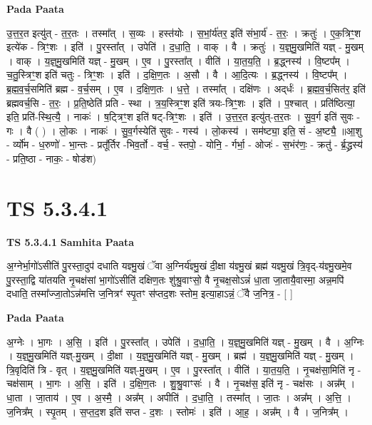 \documentclass[17pt]{extarticle}
\begin{document}
\textbf{Pada Paata} \newline

उ॒त्त॒र॒त इत्यु॑त् - त॒र॒तः । तस्मा᳚त् । स॒व्यः । हस्त॑योः । स॒भां॒र्य॑तर॒ इति॑ संभा॒र्य॑ - त॒रः॒ । क्रतुः॑ । ए॒क॒त्रिꣳ॒॒श इत्ये॑क - त्रिꣳ॒॒शः । इति॑ । पु॒रस्ता᳚त् । उपेति॑ । द॒धा॒ति॒ । वाक् । वै । क्रतुः॑ । य॒ज्ञ्॒मु॒खमिति॑ यज्ञ् - मु॒खम् । वाक् । य॒ज्ञ्॒मु॒खमिति॑ यज्ञ् - मु॒खम् । ए॒व । पु॒रस्ता᳚त् । वीति॑ । या॒त॒य॒ति॒ । ब्र॒द्ध्नस्य॑ । वि॒ष्टप᳚म् । च॒तु॒स्त्रिꣳ॒॒श इति॑ चतुः - त्रिꣳ॒॒शः । इति॑ । द॒क्षि॒ण॒तः । अ॒सौ । वै । आ॒दि॒त्यः । ब्र॒द्ध्नस्य॑ । वि॒ष्टप᳚म् । ब्र॒ह्म॒व॒र्च॒समिति॑ ब्रह्म - व॒र्च॒सम् । ए॒व । द॒क्षि॒ण॒तः । ध॒त्ते॒ । तस्मा᳚त् । दक्षि॑णः । अद्‌र्धः॑ । ब्र॒ह्म॒व॒र्च॒सित॑र॒ इति॑ ब्रह्मवर्च॒सि - त॒रः॒ । प्र॒ति॒ष्ठेति॑ प्रति - स्था । त्र॒य॒स्त्रिꣳ॒॒श इति॑ त्रयः-त्रिꣳ॒॒शः । इति॑ । प॒श्चात् । प्रति॑ष्ठित्या॒ इति॒ प्रति॑-स्थि॒त्यै॒ । नाकः॑ । ष॒ट्त्रिꣳ॒॒श इति॑ षट्-त्रिꣳ॒॒शः । इति॑ । उ॒त्त॒र॒त इत्यु॑त्-त॒र॒तः । सु॒व॒र्ग इति॑ सुवः - गः । वै ( ) । लो॒कः । नाकः॑ । सु॒व॒र्गस्येति॑ सुवः - गस्य॑ । लो॒कस्य॑ । सम॑ष्ट्या॒ इति॒ सं - अ॒ष्ट्यै॒ ॥आ॒शु - र्व्यो॑म - ध॒रुणो॑ - भा॒न्तः - प्रतू᳚र्तिर -भिव॒र्तो - वर्च॒ - स्तपो॒ - योनि॒ - र्गर्भा॒ - ओजः॑ - स॒भंर॑णः॒ - क्रतु॑ - र्ब्र॒द्ध्रस्य॑ - प्रति॒ष्ठा - नाकः॒ - षोड॑श)  \newline





\section{ TS 5.3.4.1 }

\textbf{TS 5.3.4.1 } \newline
\textbf{Samhita Paata} \newline

अ॒ग्नेर्भा॒गो॑ऽसीति॑ पु॒रस्ता॒दुप॑ दधाति यज्ञ्मु॒खं ॅवा अ॒ग्निर्य॑ज्ञ्मु॒खं दी॒क्षा य॑ज्ञ्मु॒खं ब्रह्म॑ यज्ञ्मु॒खं त्रि॒वृद्-य॑ज्ञ्मु॒खमे॒व पु॒रस्ता॒द्वि या॑तयति नृ॒चक्ष॑सां भा॒गो॑ऽसीति॑ दक्षिण॒तः शु॑श्रु॒वाꣳसो॒ वै नृ॒चक्ष॒सोऽन्नं॑ धा॒ता जा॒तायै॒वास्मा॒ अन्न॒मपि॑ दधाति॒ तस्मा᳚ज्जा॒तोऽन्न॑मत्ति ज॒नित्रꣳ॑ स्पृ॒तꣳ स॑प्तद॒शः स्तोम॒ इत्या॒हाऽन्नं॒ ॅवै ज॒नित्र॒ - [  ] \newline

\textbf{Pada Paata} \newline

अ॒ग्नेः । भा॒गः । अ॒सि॒ । इति॑ । पु॒रस्ता᳚त् । उपेति॑ । द॒धा॒ति॒ । य॒ज्ञ्॒मु॒खमिति॑ यज्ञ् - मु॒खम् । वै । अ॒ग्निः । य॒ज्ञ्॒मु॒खमिति॑ यज्ञ्-मु॒खम् । दी॒क्षा । य॒ज्ञ्॒मु॒खमिति॑ यज्ञ् - मु॒खम् । ब्रह्म॑ । य॒ज्ञ्॒मु॒खमिति॑ यज्ञ् - मु॒खम् । त्रि॒वृदिति॑ त्रि - वृत् । य॒ज्ञ्॒मु॒खमिति॑ यज्ञ्-मु॒खम् । ए॒व । पु॒रस्ता᳚त् । वीति॑ । या॒त॒य॒ति॒ । नृ॒चक्ष॑सा॒मिति॑ नृ - चक्ष॑साम् । भा॒गः । अ॒सि॒ । इति॑ । द॒क्षि॒ण॒तः । शु॒श्रु॒वाꣳसः॑ । वै । नृ॒चक्ष॑स॒ इति॑ नृ - चक्ष॑सः । अन्न᳚म् । धा॒ता । जा॒ताय॑ । ए॒व । अ॒स्मै॒ । अन्न᳚म् । अपीति॑ । द॒धा॒ति॒ । तस्मा᳚त् । जा॒तः । अन्न᳚म् । अ॒त्ति॒ । ज॒नित्र᳚म् । स्पृ॒तम् । स॒प्त॒द॒श इति॑ सप्त - द॒शः । स्तोमः॑ । इति॑ । आ॒ह॒ । अन्न᳚म् । वै । ज॒नित्र᳚म् ।  \newline
\end{document}
